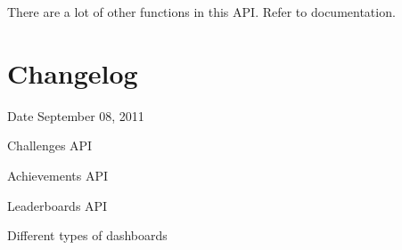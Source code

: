 There are a lot of other functions in this API. Refer to documentation.\hypertarget{index_sec_5}{}\section{Changelog}\label{index_sec_5}
Date September 08, 2011
\begin{DoxyItemize}
\item Challenges API
\item Achievements API
\item Leaderboards API
\item Different types of dashboards 
\end{DoxyItemize}